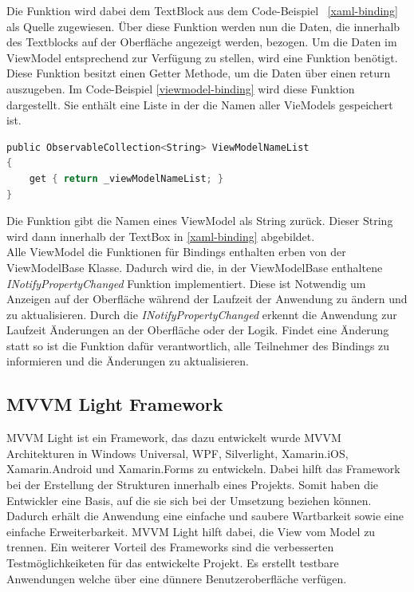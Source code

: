 Die Funktion wird dabei dem TextBlock aus dem Code-Beispiel ~\ref{xaml-binding} als Quelle zugewiesen. Über diese Funktion werden nun die Daten, die innerhalb des Textblocks auf der Oberfläche angezeigt werden, bezogen. Um die Daten im ViewModel entsprechend zur Verfügung zu stellen, wird eine Funktion benötigt. Diese Funktion besitzt einen Getter Methode, um die Daten über einen return auszugeben. Im Code-Beispiel \ref{viewmodel-binding} wird diese Funktion dargestellt. Sie enthält eine Liste in der die Namen aller VieModels gespeichert ist. 
\\
\begin{lstlisting}[language=C,
    frame=single,           % Ein Rahmen um den Code
    framexleftmargin=15pt,  % Rahmen link von den Zahlen
    style=algoBericht,
    label={viewmodel-binding},
    captionpos=b,           % Caption unter den Code setzen
    caption={Binding im ViewModel}]
public ObservableCollection<String> ViewModelNameList
{
    get { return _viewModelNameList; }
}
\end{lstlisting}
Die Funktion gibt die Namen eines ViewModel als String zurück. Dieser String wird dann innerhalb der TextBox in \ref{xaml-binding} abgebildet.
\\ Alle ViewModel die Funktionen für Bindings enthalten erben von der ViewModelBase Klasse. Dadurch wird die, in der ViewModelBase enthaltene \textit{INotifyPropertyChanged} Funktion implementiert. Diese ist Notwendig um Anzeigen auf der Oberfläche während der Laufzeit der Anwendung zu ändern und zu aktualisieren. 
Durch die \textit{INotifyPropertyChanged} erkennt die Anwendung zur Laufzeit Änderungen an der Oberfläche oder der Logik. Findet eine Änderung statt so ist die Funktion dafür verantwortlich, alle Teilnehmer des Bindings zu informieren und die Änderungen zu aktualisieren. \cite{mvvm.2010s}

\subsection{MVVM Light Framework}
MVVM Light ist ein Framework, das dazu entwickelt wurde MVVM Architekturen in Windows Universal, WPF, Silverlight, Xamarin.iOS, Xamarin.Android und Xamarin.Forms zu entwickeln. Dabei hilft das Framework bei der Erstellung der Strukturen innerhalb eines Projekts. Somit haben die Entwickler eine Basis, auf die sie sich bei der Umsetzung beziehen können. Dadurch erhält die Anwendung eine einfache und saubere Wartbarkeit sowie eine einfache Erweiterbarkeit. MVVM Light hilft dabei, die View vom Model zu trennen. Ein weiterer Vorteil des Frameworks sind die verbesserten Testmöglichkeiketen für das entwickelte Projekt. Es erstellt testbare Anwendungen welche über eine dünnere Benutzeroberfläche verfügen. \cite{mvvmLight.2020a}

\endinput

